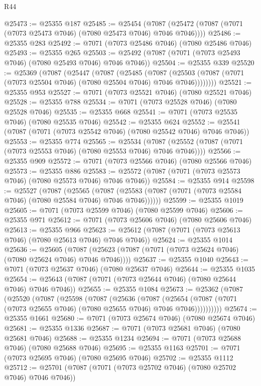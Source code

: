 \begin{lexlean}{R44}
\begin{coremodule}
{@25473 := @25355 @187
@25485 := @25454
    (@7087 (@25472 (@7087 (@7071 (@7073 @25473 @7046) (@7080 @25473 @7046) @7046 @7046))))
@25486 := @25355 @283
@25492 := @7071 (@7073 @25486 @7046) (@7080 @25486 @7046)
@25493 := @25355 @265
@25503 := @25492 (@7087 (@7071 (@7073 @25493 @7046) (@7080 @25493 @7046) @7046 @7046))
@25504 := @25355 @339
@25520 := @25369
    (@7087
      (@25447
        (@7087
          (@25485
            (@7087
              (@25503 (@7087 (@7071 (@7073 @25504 @7046) (@7080 @25504 @7046) @7046 @7046))))))))
@25521 := @25355 @953
@25527 := @7071 (@7073 @25521 @7046) (@7080 @25521 @7046)
@25528 := @25355 @788
@25534 := @7071 (@7073 @25528 @7046) (@7080 @25528 @7046)
@25535 := @25355 @668
@25541 := @7071 (@7073 @25535 @7046) (@7080 @25535 @7046)
@25542 := @25355 @624
@25552 := @25541 (@7087 (@7071 (@7073 @25542 @7046) (@7080 @25542 @7046) @7046 @7046))
@25553 := @25355 @774
@25565 := @25534
    (@7087 (@25552 (@7087 (@7071 (@7073 @25553 @7046) (@7080 @25553 @7046) @7046 @7046))))
@25566 := @25355 @909
@25572 := @7071 (@7073 @25566 @7046) (@7080 @25566 @7046)
@25573 := @25355 @886
@25583 := @25572 (@7087 (@7071 (@7073 @25573 @7046) (@7080 @25573 @7046) @7046 @7046))
@25584 := @25355 @914
@25598 := @25527
    (@7087
      (@25565
        (@7087 (@25583 (@7087 (@7071 (@7073 @25584 @7046) (@7080 @25584 @7046) @7046 @7046))))))
@25599 := @25355 @1019
@25605 := @7071 (@7073 @25599 @7046) (@7080 @25599 @7046)
@25606 := @25355 @971
@25612 := @7071 (@7073 @25606 @7046) (@7080 @25606 @7046)
@25613 := @25355 @966
@25623 := @25612 (@7087 (@7071 (@7073 @25613 @7046) (@7080 @25613 @7046) @7046 @7046))
@25624 := @25355 @1014
@25636 := @25605
    (@7087 (@25623 (@7087 (@7071 (@7073 @25624 @7046) (@7080 @25624 @7046) @7046 @7046))))
@25637 := @25355 @1040
@25643 := @7071 (@7073 @25637 @7046) (@7080 @25637 @7046)
@25644 := @25355 @1035
@25654 := @25643 (@7087 (@7071 (@7073 @25644 @7046) (@7080 @25644 @7046) @7046 @7046))
@25655 := @25355 @1084
@25673 := @25362
    (@7087
      (@25520
        (@7087
          (@25598
            (@7087
              (@25636
                (@7087
                  (@25654
                    (@7087 (@7071 (@7073 @25655 @7046) (@7080 @25655 @7046) @7046 @7046))))))))))
@25674 := @25355 @1661
@25680 := @7071 (@7073 @25674 @7046) (@7080 @25674 @7046)
@25681 := @25355 @1336
@25687 := @7071 (@7073 @25681 @7046) (@7080 @25681 @7046)
@25688 := @25355 @1234
@25694 := @7071 (@7073 @25688 @7046) (@7080 @25688 @7046)
@25695 := @25355 @1163
@25701 := @7071 (@7073 @25695 @7046) (@7080 @25695 @7046)
@25702 := @25355 @1112
@25712 := @25701 (@7087 (@7071 (@7073 @25702 @7046) (@7080 @25702 @7046) @7046 @7046))
}
\end{coremodule}
\end{lexlean}
